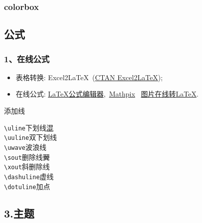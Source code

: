 \documentclass[12pt,hyperref,UTF8,aspectratio=169]{beamer}
\begin{document}
\begin{frame}
    \frametitle{colorbox}

\end{frame}


\subsection{公式}
\begin{frame}
    \frametitle{1、在线公式}

    \begin{itemize}
        \item<2-> 表格转换: Excel2\LaTeX~(\href{https://www.ctan.org/tex-archive/support/excel2latex/}{CTAN Excel2\LaTeX});
        \item<2-> 在线公式: \href{https://www.latexlive.com/}{LaTeX公式编辑器},~\href{https://mathpix.com/}{Mathpix}~ \href{https://mathf.itewqq.cn/}{图片在线转LaTeX}.
    \end{itemize}

\end{frame}

\begin{frame}[fragile]{添加线}
	\begin{multicols}{2}
		\verb|\uline|\hfill 下划线\qquad\uline{混}\\
		\verb|\uuline|\hfill 双下划线\qquad{}\\
		\verb|\uwave|\hfill 波浪线\qquad{}\\
		\verb|\sout|\hfill 删除线\qquad\sout{翼}\\
		\verb|\xout|\hfill 斜删除线\qquad{}\\
		\verb|\dashuline|\hfill 虚线\qquad{}\\
		\verb|\dotuline|\hfill 加点\qquad{}
	\end{multicols}
\end{frame}

\subsection{3.主题}
\end{document}
